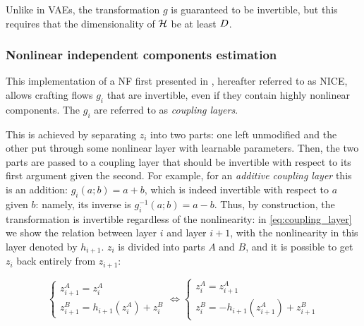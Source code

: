 \documentclass[../main.tex]{subfiles}
\begin{document}
Unlike in VAEs, the transformation $g$ is guaranteed to be invertible, but this requires that the dimensionality of $\mathcal{H}$ be at least $D$.

\subsubsection{Nonlinear independent components estimation}

This implementation of a NF first presented in \cite{dinhNICE2015}, hereafter referred to as NICE, allows crafting flows $g_i$ that are invertible, even if they contain highly nonlinear components.
The $g_i$ are referred to as \emph{coupling layers}.

This is achieved by separating $z_i$ into two parts: one left unmodified and the other put through some nonlinear layer with learnable parameters.
Then, the two parts are passed to a coupling layer that should be invertible with respect to its first argument given the second.
For example, for an \emph{additive coupling layer} this is an addition: $g_i(a; b) = a + b$, which is indeed invertible with respect to $a$ given $b$: namely, its inverse is $g_i^{-1}(a; b) = a - b$.
Thus, by construction, the transformation is invertible regardless of the nonlinearity: in \autoref{eq:coupling_layer} we show the relation between layer $i$ and layer $i+1$, with the nonlinearity in this layer denoted by $h_{i+1}$. $z_i$ is divided into parts $A$ and $B$, and it is possible to get $z_i$ back entirely from $z_{i+1}$:

\begin{equation}
    \label{eq:coupling_layer}
    \begin{cases}
        z_{i+1}^A = z_i^A \\
        z_{i+1}^B = h_{i+1}(z_i^A) + z_i^B
    \end{cases}
    \Leftrightarrow
    \begin{cases}
        z_i^A = z_{i+1}^A \\
        z_i^B = -h_{i+1}(z_{i+1}^A) + z_{i+1}^B
    \end{cases}
\end{equation}
\end{document}
